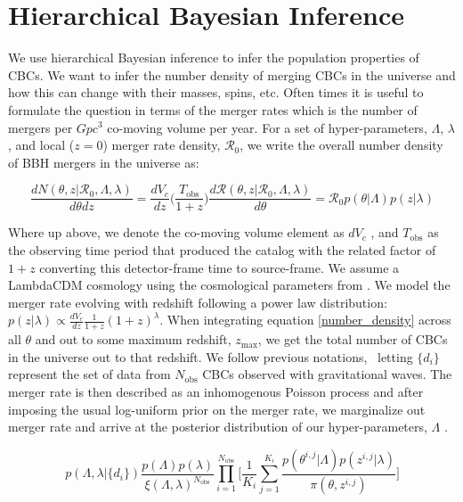 \appendix
\section{Hierarchical Bayesian Inference} \label{sec:hierarchical_inference}

We use hierarchical Bayesian inference to infer the population properties of CBCs. We want to infer the number density of merging CBCs 
in the universe and how this can change with their masses, spins, etc. Often times it is useful to formulate the question in terms of the 
merger rates which is the number of mergers per $Gpc^{3}$ co-moving volume per year. For a set of hyper-parameters, $\Lambda$, $\lambda$, and local ($z=0$) 
merger rate density, $\mathcal{R}_0$, we write the overall number density of BBH mergers in the universe as: 

\begin{equation} \label{number_density}
     \frac{dN(\theta, z | \mathcal{R}_0, \Lambda, \lambda)}{d\theta dz} = \frac{dV_c}{dz}\bigg(\frac{T_\mathrm{obs}}{1+z}\bigg) \frac{d\mathcal{R}(\theta, z | \mathcal{R}_0, \Lambda, \lambda)}{d\theta} = \mathcal{R}_0 p(\theta | \Lambda) p(z | \lambda)
\end{equation}

\noindent
Where up above, we denote the co-moving volume element as $dV_c$ \citep{hogg_cosmo}, and $T_\mathrm{obs}$ as the observing time period that produced the 
catalog with the related factor of $1+z$ converting this detector-frame time to source-frame. We assume a LambdaCDM cosmology using 
the cosmological parameters from \citet{Planck2015}. We model the merger rate evolving with redshift following a power law distribution: 
$p(z|\lambda) \propto \frac{dV_c}{dz}\frac{1}{1+z}(1+z)^\lambda$. When integrating equation \ref{number_density} across all $\theta$
and out to some maximum redshift, $z_\mathrm{max}$, we get the total number of CBCs in the universe out to that redshift. We follow previous notations, \
letting $\{d_i\}$ represent the set of data from $N_\mathrm{obs}$ CBCs observed with gravitational waves. The merger rate is then described as an inhomogenous 
Poisson process and after imposing the usual log-uniform prior on the merger rate, we marginalize out merger rate and arrive at the posterior
distribution of our hyper-parameters, $\Lambda$ \citep{Mandel_2019, Vitale_2021}.

\begin{equation}
    p\left(\Lambda, \lambda | \{d_i\}\right) \frac{p(\Lambda)p(\lambda)}{\xi(\Lambda,\lambda)^{N_\mathrm{obs}}} \prod_{i=1}^{N_\mathrm{obs}} \bigg[ \frac{1}{K_i} \sum_{j=1}^{K_i} \frac{p(\theta^{i,j}|\Lambda)p(z^{i,j}|\lambda)}{\pi(\theta, z^{i,j})} \bigg]
\end{equation}

